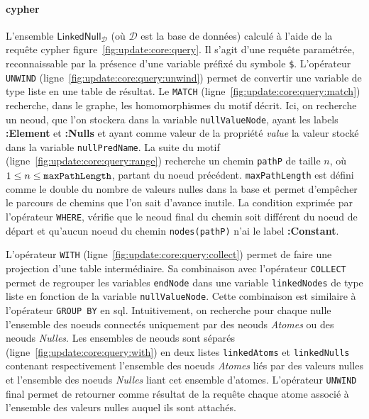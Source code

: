 \paragraph{\gls{cypher}}
L'ensemble $\textsf{LinkedNull}_{\mathcal{D}}$ (où $\mathcal{D}$ est la base de données) calculé à l'aide de la requête \gls{cypher} figure~\ref{fig:update:core:query}.
Il s'agit d'une requête paramétrée, reconnaissable par la présence d'une variable préfixé du symbole \verb|$|.
L'opérateur \verb|UNWIND| (ligne~\ref{fig:update:core:query:unwind}) permet de convertir une variable de type liste en une table de résultat.
Le \verb|MATCH| (ligne~\ref{fig:update:core:query:match}) recherche, dans le graphe, les homomorphismes du motif décrit.
Ici, on recherche un neoud, que l'on stockera dans la variable \verb|nullValueNode|, ayant les labels \textbf{:Element} et \textbf{:Nulls} et ayant comme valeur de la propriété \textit{value} la valeur stocké dans la variable \verb|nullPredName|.
La suite du motif (ligne~\ref{fig:update:core:query:range}) recherche un chemin \verb|pathP| de taille $n$, où $1 \leq n \leq \verb|maxPathLength|$, partant du noeud précédent.
\verb|maxPathLength| est défini comme le double du nombre de valeurs nulles dans la base et permet d'empêcher le parcours de chemins que l'on sait d'avance inutile.
La condition exprimée par l'opérateur \verb|WHERE|, vérifie que le neoud final du chemin soit différent du noeud de départ et qu'aucun noeud du chemin \verb|nodes(pathP)| n'ai le label \textbf{:Constant}.

L'opérateur \verb|WITH| (ligne~\ref{fig:update:core:query:collect}) permet de faire une projection d'une table intermédiaire.
Sa combinaison avec l'opérateur \verb|COLLECT| permet de regrouper les variables \verb|endNode| dans une variable \verb|linkedNodes| de type liste en fonction de la variable \verb|nullValueNode|.
Cette combinaison est similaire à l'opérateur \verb|GROUP BY| en \gls{sql}.
Intuitivement, on recherche pour chaque nulle l'ensemble des noeuds connectés uniquement par des neouds \textit{Atomes} ou des neouds \textit{Nulles}.
Les ensembles de neouds sont séparés (ligne~\ref{fig:update:core:query:with}) en deux listes \verb|linkedAtoms| et \verb|linkedNulls| contenant respectivement l'ensemble des noeuds \textit{Atomes} liés par des valeurs nulles et l'ensemble des noeuds \textit{Nulles} liant cet ensemble d'atomes.
L'opérateur \verb|UNWIND| final permet de retourner comme résultat de la requête chaque atome associé à l'ensemble des valeurs nulles auquel ils sont attachés.

